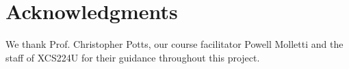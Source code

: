 \section*{Acknowledgments}

We thank Prof. Christopher Potts, our course facilitator Powell Molletti and the staff of XCS224U for their guidance throughout this project.
